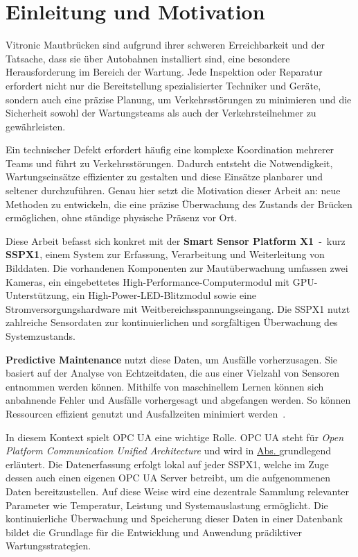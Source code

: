 \chapter{Einleitung und Motivation}
Vitronic Mautbrücken sind aufgrund ihrer schweren Erreichbarkeit und der Tatsache, dass sie über Autobahnen installiert
sind, eine besondere Herausforderung im Bereich der Wartung. Jede Inspektion oder Reparatur erfordert nicht nur die
Bereitstellung spezialisierter Techniker und Geräte, sondern auch eine präzise Planung, um Verkehrsstörungen zu
minimieren und die Sicherheit sowohl der Wartungsteams als auch der Verkehrsteilnehmer zu gewährleisten.

Ein technischer Defekt erfordert häufig eine komplexe Koordination mehrerer Teams und führt zu Verkehrsstörungen. Dadurch
entsteht die Notwendigkeit, Wartungseinsätze effizienter zu gestalten und diese
Einsätze planbarer und seltener durchzuführen. Genau hier setzt die Motivation dieser Arbeit an: neue Methoden zu entwickeln, die
eine präzise Überwachung des Zustands der Brücken ermöglichen, ohne ständige physische Präsenz vor Ort.

Diese Arbeit befasst sich konkret mit der \textbf{Smart Sensor Platform X1}~-~kurz \textbf{SSPX1}, einem System zur
Erfassung, Verarbeitung und Weiterleitung von Bilddaten. Die vorhandenen Komponenten zur Mautüberwachung umfassen zwei Kameras,
ein eingebettetes High-Performance-Computermodul mit GPU-Unterstützung, ein High-Power-LED-Blitzmodul sowie
eine Stromversorgungshardware mit Weitbereichsspannungseingang. Die SSPX1 nutzt zahlreiche Sensordaten zur
kontinuierlichen und sorgfältigen Überwachung des Systemzustands.

\textbf{Predictive Maintenance} nutzt diese Daten, um Ausfälle vorherzusagen. Sie basiert auf der Analyse
von Echtzeitdaten, die aus einer Vielzahl von Sensoren entnommen werden können. Mithilfe von maschinellem Lernen können
sich anbahnende Fehler und Ausfälle vorhergesagt und abgefangen werden. So können Ressourcen effizient
genutzt und Ausfallzeiten minimiert werden~\cite[S.~3]{Scheffer2004}.

In diesem Kontext spielt OPC UA eine wichtige Rolle. OPC UA steht für \textit{Open Platform Communication
Unified Architecture} und wird in \hyperref[sec:technologische_grundlagen]{Abs. } grundlegend erläutert.
Die Datenerfassung erfolgt lokal auf jeder SSPX1, welche im Zuge dessen auch einen eigenen OPC UA Server betreibt, um die aufgenommenen
Daten bereitzustellen. Auf diese Weise wird eine dezentrale Sammlung relevanter Parameter wie Temperatur,
Leistung und Systemauslastung ermöglicht. Die kontinuierliche Überwachung und Speicherung dieser Daten in einer Datenbank
bildet die Grundlage für die Entwicklung und Anwendung prädiktiver Wartungsstrategien.

